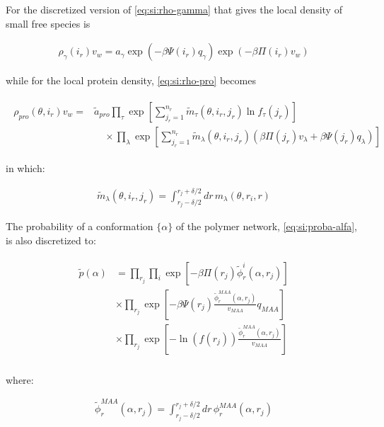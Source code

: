 \documentclass[journal=jacsat,manuscript=suppinfo]{achemso}
\begin{document}
For the discretized version of \cref{eq:si:rho-gamma} that gives the local density of small free species is

\begin{align}
	\rho_\gamma(i_r)v_w = a_\gamma \exp{\left(-\beta \Psi(i_r)q_\gamma\right)} \exp{\left(-\beta\Pi(i_r) v_w\right)}
\end{align}



while for the local protein density, \cref{eq:si:rho-pro} becomes



\begin{align}
	\begin{aligned}
		\rho_{pro}(\theta, i_r)v_w = &\tilde{a}_{pro} \prod_\tau\exp\left[ \sum^{n_r}_{j_r = 1} \tilde{m}_\tau(\theta,i_r,j_r) \ln f_\tau(j_r)\right] \\
		& \hspace{1em} \times \prod_\lambda \exp \left[ \sum^{n_r}_{j_r = 1} \tilde{m}_\lambda(\theta,i_r, j_r)\left(\beta\Pi(j_r) v_\lambda+ \beta \Psi(j_r)q_\lambda\right) \right]
	\end{aligned}
\end{align}

\noindent in which:

\begin{align}
	\tilde{m}_\lambda(\theta,i_r,j_r) =\int_{r_j -\delta/2}^{r_j + \delta/2} dr \, m_\lambda(\theta, r_i, r) 
\end{align}


The probability of a conformation $\{\alpha\}$ of the polymer network, \ref{eq:si:proba-alfa}, is also discretized to:

\begin{align}
	\begin{aligned}
				\tilde{p}(\alpha)&= \prod_{r_j}\prod_i \exp\left[{- {\beta\Pi(r_j) \tilde{\phi}^i_r(\alpha,r_j)}}\right] \\
	& \times \prod_{r_j} \exp \left[ - \beta \Psi(r_j)\frac{\tilde{ \phi}^{MAA}_r(\alpha,r_j)}{v_{MAA}} q_{MAA}  \right] \\
	& \times \prod_{r_j} \exp\left[ - { \ln(f(r_j))\frac{\tilde{ \phi}^{MAA}_r(\alpha,r_j)}{v_{MAA}}}\right] \\
	\end{aligned}
\end{align}

\noindent where:

\begin{align}
	\tilde{ \phi}^{MAA}_r(\alpha,r_j) = \int_{r_j -\delta/2}^{r_j + \delta/2} dr \, \phi^{MAA}_r(\alpha,r_j)
\end{align}
\end{document}
